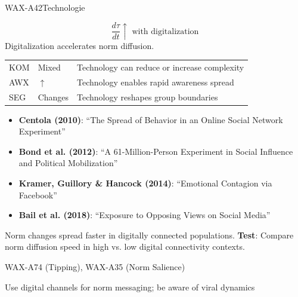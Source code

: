 \begin{axiomspec}{WAX-A42}{Technologie}

\begin{equation}
\frac{d\tau}{dt} \uparrow \text{ with digitalization}
\end{equation}
Digitalization accelerates norm diffusion.

\begin{tabular}{lll}
KOM & Mixed & Technology can reduce or increase complexity \\
AWX & $\uparrow$ & Technology enables rapid awareness spread \\
SEG & Changes & Technology reshapes group boundaries \\
\end{tabular}

\begin{itemize}
\item \textbf{Centola (2010)}: ``The Spread of Behavior in an Online Social Network Experiment''
\item \textbf{Bond et al. (2012)}: ``A 61-Million-Person Experiment in Social Influence and Political Mobilization''
\item \textbf{Kramer, Guillory \& Hancock (2014)}: ``Emotional Contagion via Facebook''
\item \textbf{Bail et al. (2018)}: ``Exposure to Opposing Views on Social Media''
\end{itemize}

Norm changes spread faster in digitally connected populations.
\textbf{Test}: Compare norm diffusion speed in high vs. low digital connectivity contexts.

WAX-A74 (Tipping), WAX-A35 (Norm Salience)

Use digital channels for norm messaging; be aware of viral dynamics

\end{axiomspec}


